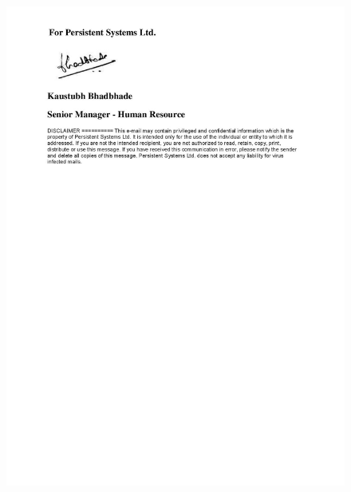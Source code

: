 \documentclass[oneside,a4paper,12pt]{report}
\begin{document}
{  \newpage {\bfseries \fontsize{14}{12} \selectfont
\vspace*{2\baselineskip}} \setlength{\parindent}{11mm} }
\begin{center}
	\begin{figure}[!htbp]
		\centering
		\includegraphics[width=\textwidth]{sponsorship-letter-2}
	\end{figure}
\end{center}
\end{document}
